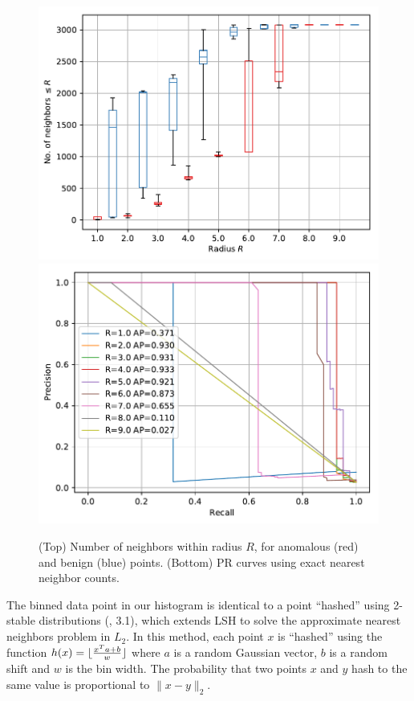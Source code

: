 \documentclass[11pt,onecolumn]{article}
\DeclarePairedDelimiter\floor{\lfloor}{\rfloor}
\begin{document}
\begin{figure}
    \centering
		\includegraphics[width=\linewidth]{fig/exact_nn.pdf}
		\includegraphics[width=\linewidth]{fig/exact_prcurve.pdf}
    \caption{\small(Top) Number of neighbors within radius $R$, for anomalous (red) and benign (blue) points. (Bottom) PR curves using exact nearest neighbor counts.}
\end{figure}

The binned data point in our histogram is identical to a point ``hashed'' using 2-stable distributions (\cite{datar2004locality}, 3.1), which extends LSH to solve the approximate nearest neighbors problem in $L_2$. In this method, each point $x$ is ``hashed'' using the function $h(x) = \floor{\frac{x^Ta + b}{w}}$ where $a$ is a random Gaussian vector, $b$ is a random shift and $w$ is the bin width. The probability that two points $x$ and $y$ hash to the same value is proportional to $\|x-y\|_2$.
\end{document}
